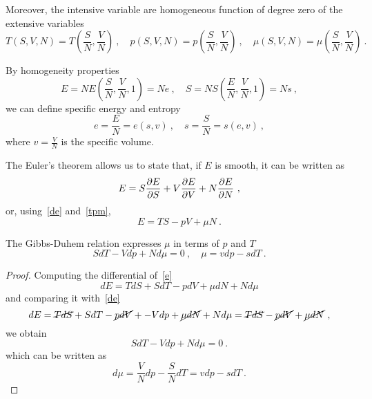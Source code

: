     Moreover, the intensive variable are homogeneous function of degree zero of the extensive variables 
    \begin{equation}\label{a5}
        T(S, V, N) = T(\frac{S}{N}, \frac{V}{N}) ~, \quad p(S, V, N) = p(\frac{S}{N}, \frac{V}{N}) ~, \quad \mu(S, V, N) = \mu(\frac{S}{N}, \frac{V}{N}) ~.
    \end{equation}

    By homogeneity properties 
    \begin{equation*}
        E = N E (\frac{S}{N}, \frac{V}{N}, 1) = N e ~, \quad  S = N S(\frac{E}{N}, \frac{V}{N}, 1) = N s ~,
    \end{equation*}
    we can define specific energy and entropy 
    \begin{equation*}
        e = \frac{E}{N} = e(s, v) ~, \quad s = \frac{S}{N} = s(e, v) ~,
    \end{equation*}
    where $v = \frac{V}{N}$ is the specific volume.

    The Euler's theorem allows us to state that, if $E$ is smooth, it can be written as 
    \begin{equation*}
        E = S \frac{\partial E}{\partial S} + V \frac{\partial E}{\partial V} + N \frac{\partial E}{\partial N} ~,
    \end{equation*}
    or, using~\eqref{de} and~\eqref{tpm}, 
    \begin{equation}\label{e}
        E = TS - pV + \mu N ~.
    \end{equation}

    The Gibbs-Duhem relation expresses $\mu$ in terms of $p$ and $T$ 
    \begin{equation*}
        S dT - Vdp + N d\mu = 0 ~, \quad \mu = v dp - s dT ~.
    \end{equation*}
    \begin{proof}
        Computing the differential of~\eqref{e} 
        \begin{equation*}
            dE = T dS + S dT -p dV + \mu dN + N d\mu 
        \end{equation*}
        and comparing it with~\eqref{de}
        \begin{equation*}
            dE = \cancel{T dS} + S dT - \cancel{p dV} + - V dp + \cancel{\mu dN} + N d\mu = \cancel{T dS} - \cancel{p dV} + \cancel{\mu dN} ~,
        \end{equation*}
        we obtain 
        \begin{equation*}
            S dT - V dp + N d\mu = 0 ~.
        \end{equation*}
        which can be written as 
        \begin{equation*}
            d \mu = \frac{V}{N} dp - \frac{S}{N} dT = v dp - s dT ~.
        \end{equation*}
    \end{proof}

